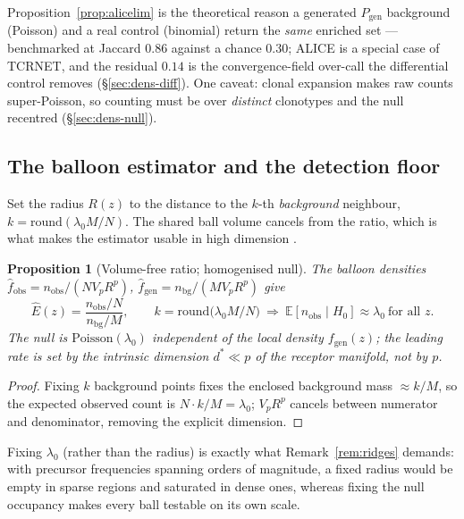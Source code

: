 \documentclass[11pt]{article}
\theoremstyle{oldplain}
\newtheorem{proposition}{Proposition}
\theoremstyle{oldrem}
\newcommand{\Pgen}{P_{\mathrm{gen}}}
\newcommand{\E}{\mathds{E}}
\begin{document}
Proposition~\ref{prop:alicelim} is the theoretical reason a generated $\Pgen$ background (Poisson) and a real
control (binomial) return the \emph{same} enriched set --- benchmarked at Jaccard $0.86$ against a chance
$0.30$; {\scshape ALICE} is a special case of {\scshape TCRNET}, and the residual $0.14$ is the
convergence-field over-call the differential control removes (\S\ref{sec:dens-diff}). One caveat: clonal
expansion makes raw counts super-Poisson, so counting must be over \emph{distinct} clonotypes and the null
recentred (\S\ref{sec:dens-null}).

\subsection{The balloon estimator and the detection floor}\label{sec:dens-balloon}

Set the radius $R(z)$ to the distance to the $k$-th \emph{background} neighbour, $k=\mathrm{round}(\lambda_0
M/N)$. The shared ball volume cancels from the ratio, which is what makes the estimator usable in high
dimension \cite{Loftsgaarden1965,Terrell1992,BiauDevroye2015}.

\begin{proposition}[Volume-free ratio; homogenised null]\label{prop:balloon}
The balloon densities $\hat f_{\mathrm{obs}}=n_{\mathrm{obs}}/(N V_pR^p)$,
$\hat f_{\mathrm{gen}}=n_{\mathrm{bg}}/(M V_pR^p)$ give
\begin{equation}\label{eq:volfree}
  \hat E(z)=\frac{n_{\mathrm{obs}}/N}{n_{\mathrm{bg}}/M},\qquad
  k=\mathrm{round}\!\big(\lambda_0 M/N\big)\ \Longrightarrow\ \E[n_{\mathrm{obs}}\mid H_0]\approx\lambda_0
  \ \text{for all }z.
\end{equation}
The null is $\mathrm{Poisson}(\lambda_0)$ independent of the local density $f_{\mathrm{gen}}(z)$; the leading
rate is set by the intrinsic dimension $d^\ast\ll p$ of the receptor manifold, not by $p$.
\end{proposition}
\begin{proof}
Fixing $k$ background points fixes the enclosed background mass $\approx k/M$, so the expected observed count
is $N\!\cdot\!k/M=\lambda_0$; $V_pR^p$ cancels between numerator and denominator, removing the explicit
dimension.
\end{proof}

Fixing $\lambda_0$ (rather than the radius) is exactly what Remark~\ref{rem:ridges} demands: with precursor
frequencies spanning orders of magnitude, a fixed radius would be empty in sparse regions and saturated in
dense ones, whereas fixing the null occupancy makes every ball testable on its own scale.
\end{document}
